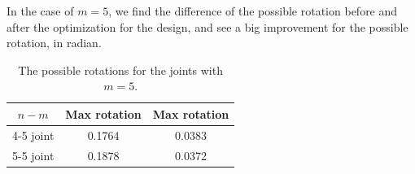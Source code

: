 \documentclass[11pt, twocolumn]{article}
\begin{document}







In the case of $m=5$, we find the difference of the possible rotation before and after the optimization for the design, and see a big improvement for the possible rotation, in radian. 

\begin{table}[h!]
  \begin{center}
    \caption{The possible rotations for the joints with $m=5$.}
    \label{tab:table1}
    \begin{tabular}{|c | c | c|}
    \hline
      \textbf{$n-m$ } & \textbf{Max rotation} & \textbf{Max rotation}\\
      \hline
      4-5 joint & 0.1764 & 0.0383\\
      \hline
      5-5 joint & 0.1878 & 0.0372\\
      \hline
    \end{tabular}
  \end{center}
\end{table}
\end{document}
